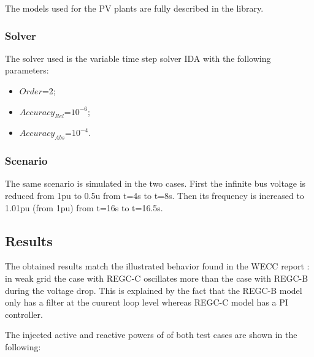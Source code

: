 \documentclass[a4paper, 12pt]{report}
\begin{document}
\par The models used for the PV plants are fully described in the \Dynawo library.

\subsubsection{Solver}

\par The solver used is the variable time step solver IDA with the following parameters:
\begin{itemize}
\item $Order$=2;
\item $Accuracy_{Rel}$=$10^{-6}$;
\item $Accuracy_{Abs}$=$10^{-4}$.
\end{itemize}

\subsubsection{Scenario}

\par The same scenario is simulated in the two cases. First the infinite bus voltage is reduced from 1pu to 0.5u from t=4s to t=8s. Then its frequency is increased to 1.01pu (from 1pu) from t=16s to t=16.5s.

\subsection{Results}

\par The obtained results match the illustrated behavior found in the WECC report : in weak grid the case with REGC-C oscillates more than the case with REGC-B during the voltage drop. This is explained by the fact that the REGC-B model only has a filter at the cuurent loop level whereas REGC-C model has a PI controller.

\par The injected active and reactive powers of of both test cases are shown in the following:
\end{document}
